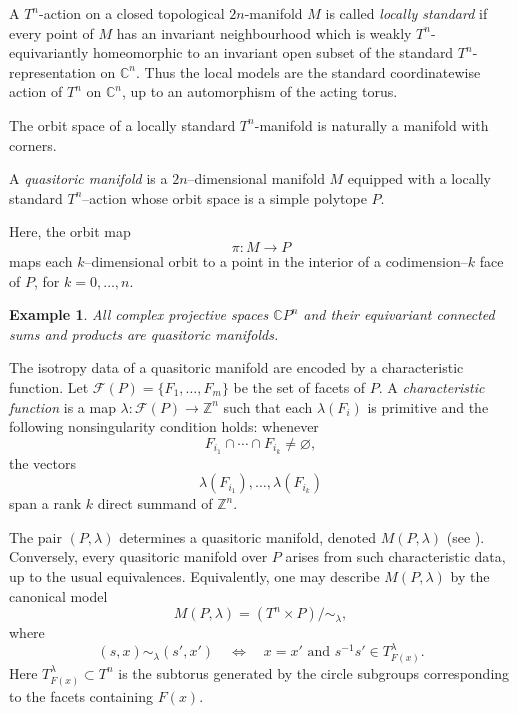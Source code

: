 \documentclass[11pt,a4paper]{article}
\numberwithin{equation}{section}
\newtheorem{example}[definition]{Example}
\theoremstyle{named}
\begin{document}
A \(T^n\)-action on a closed topological \(2n\)-manifold \(M\) is called \emph{locally standard} if every point of \(M\) has an invariant neighbourhood which is weakly \(T^n\)-equivariantly homeomorphic to an invariant open subset of the standard \(T^n\)-representation on \(\mathbb C^n\). Thus the local models are the standard coordinatewise action of \(T^n\) on \(\mathbb C^n\), up to an automorphism of the acting torus.

The orbit space of a locally standard \(T^n\)-manifold is naturally a manifold with corners. 

\begin{definition}
A \emph{quasitoric manifold} is a $2n$–dimensional manifold $M$ equipped with a locally standard $T^n$–action whose orbit space is a simple polytope $P$.
\end{definition}

\medskip

Here, the orbit map
\[
\pi : M \longrightarrow P
\]
maps each $k$--dimensional orbit to a point in the interior of a codimension--$k$ face of $P$, for $k=0,\dots,n$.

\medskip

\begin{example}
All complex projective spaces $\mathbb CP^n$ and their equivariant connected sums and products are quasitoric manifolds.
\end{example}

The isotropy data of a quasitoric manifold are encoded by a characteristic function. Let \(\mathcal F(P)=\{F_1,\ldots,F_m\}\) be the set of facets of \(P\). A \emph{characteristic function} is a map \(\lambda:\mathcal F(P)\longrightarrow \mathbb Z^n\) such that each \(\lambda(F_i)\) is primitive and the following nonsingularity condition holds: whenever
\[
    F_{i_1}\cap\cdots\cap F_{i_k}\neq\varnothing,
\]
the vectors
\[
    \lambda(F_{i_1}),\ldots,\lambda(F_{i_k})
\]
span a rank \(k\) direct summand of \(\mathbb Z^n\).

The pair \((P,\lambda)\) determines a quasitoric manifold, denoted \(M(P,\lambda)\) (see \cite[Proposition~1.8]{dj}). Conversely, every quasitoric manifold over \(P\) arises from such characteristic data, up to the usual equivalences. Equivalently, one may describe \(M(P,\lambda)\) by the canonical model
\[
    M(P,\lambda)
    =
    (T^n\times P)/{\sim_\lambda},
\]
where
\[
    (s,x)\sim_\lambda(s',x')
    \quad\Longleftrightarrow\quad
    x=x'
    \text{ and }
    s^{-1}s'\in T^{\lambda}_{F(x)}.
\]
Here \(T^{\lambda}_{F(x)}\subset T^n\) is the subtorus generated by the circle subgroups corresponding to the facets containing \(F(x)\).
\end{document}

